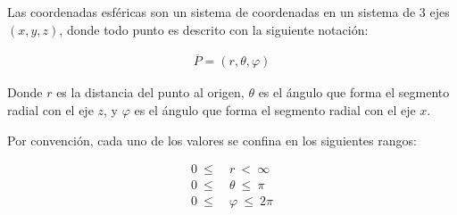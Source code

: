 Las coordenadas esféricas son un sistema de coordenadas en un sistema de 3 ejes ${\left(x,y,z\right)}$, donde todo punto es descrito con la siguiente notación:

\begin{eqnarray*}
  \overline{P}=\left(r,\theta,\varphi\right)
\end{eqnarray*}

Donde ${r}$ es la distancia del punto al origen, ${\theta}$ es el ángulo que forma el segmento radial con el eje ${z}$, y ${\varphi}$ es el ángulo que forma el segmento radial con el eje ${x}$.

Por convención, cada uno de los valores se confina en los siguientes rangos:

\begin{equation*}
  \begin{split}
    0\ \leq\ &r\ <\ \infty\\
    0\ \leq\ &\theta\ \leq\ \pi\\
    0\ \leq\ &\varphi\ \leq\ 2\pi
  \end{split}
\end{equation*}
